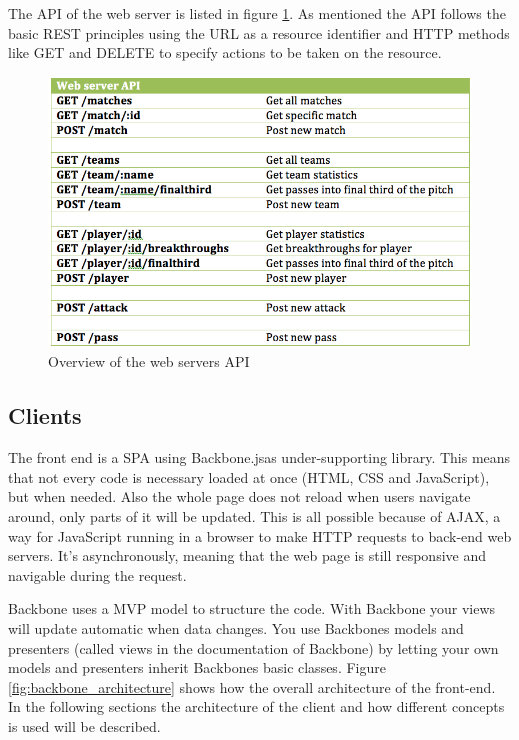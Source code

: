 The \ac{API} of the web server is listed in figure \ref{fig:api}. As mentioned the \ac{API} follows the basic \ac{REST} principles using the URL as a resource identifier and HTTP methods like GET and DELETE to specify actions to be taken on the resource.

\begin{figure}[ht!]
\centering
\includegraphics[width=1\textwidth]{images/implementation/API.png}
\caption{Overview of the web servers API}
\label{fig:api}
\end{figure}

\subsection{Clients}

The front end is a \ac{SPA} using Backbone.js\footnotemark as under-supporting library. This means that not every code is necessary loaded at once (\ac{HTML}, \ac{CSS} and JavaScript), but when needed. Also the whole page does not reload when users navigate around, only parts of it will be updated. This is all possible because of \ac{AJAX}, a way for JavaScript running in a browser to make HTTP requests to back-end web servers. It’s asynchronously, meaning that the web page is still responsive and navigable during the request\cite{ajax}.

Backbone uses a \ac{MVP} model to structure the code. With Backbone your views will update automatic when data changes. You use Backbones models and presenters (called views in the documentation of Backbone) by letting your own models and presenters inherit Backbones basic classes. Figure \ref{fig:backbone_architecture} shows how the overall architecture of the front-end. In the following sections the architecture of the client and how different concepts is used will be described. 

